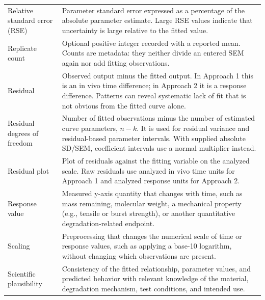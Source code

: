 \begin{longtable}{@{}>{\raggedright\arraybackslash}p{}>{\raggedright\arraybackslash}p{}@{}}
Relative standard error (RSE) & Parameter standard error expressed as a percentage of the absolute parameter estimate. Large RSE values indicate that uncertainty is large relative to the fitted value. \\

Replicate count & Optional positive integer recorded with a reported mean. Counts are metadata: they neither divide an entered SEM again nor add fitting observations. \\

Residual & Observed output minus the fitted output. In Approach 1 this is an in vivo time difference; in Approach 2 it is a response difference. Patterns can reveal systematic lack of fit that is not obvious from the fitted curve alone. \\

Residual degrees of freedom & Number of fitted observations minus the number of estimated curve parameters, \(n-k\). It is used for residual variance and residual-based parameter intervals. With supplied absolute SD/SEM, coefficient intervals use a normal multiplier instead. \\

Residual plot & Plot of residuals against the fitting variable on the analyzed scale. Raw residuals use analyzed in vivo time units for Approach 1 and analyzed response units for Approach 2. \\

Response value & Measured y-axis quantity that changes with time, such as mass remaining, molecular weight, a mechanical property (e.g., tensile or burst strength), or another quantitative degradation-related endpoint. \\


Scaling & Preprocessing that changes the numerical scale of time or response values, such as applying a base-10 logarithm, without changing which observations are present. \\

Scientific plausibility & Consistency of the fitted relationship, parameter values, and predicted behavior with relevant knowledge of the material, degradation mechanism, test conditions, and intended use. \\


\end{longtable}

